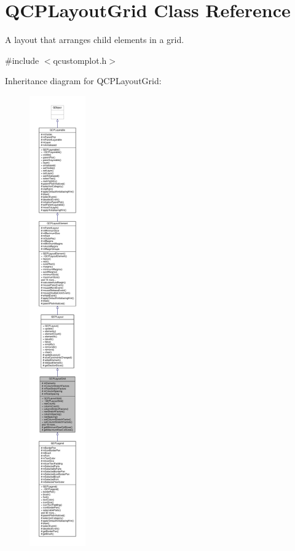 \hypertarget{class_q_c_p_layout_grid}{}\section{Q\+C\+P\+Layout\+Grid Class Reference}
\label{class_q_c_p_layout_grid}


A layout that arranges child elements in a grid.  




{\ttfamily \#include $<$qcustomplot.\+h$>$}



Inheritance diagram for Q\+C\+P\+Layout\+Grid\+:\nopagebreak
\begin{figure}[H]
\begin{center}
\leavevmode
\includegraphics[height=550pt]{class_q_c_p_layout_grid__inherit__graph}
\end{center}
\end{figure}


